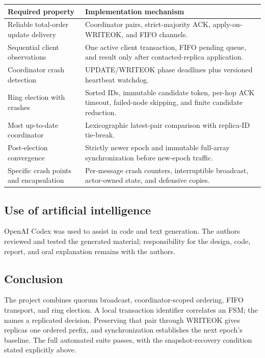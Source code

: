 \noindent\begin{tabularx}{\textwidth}{@{}p{43mm} X@{}}
\toprule
Required property & Implementation mechanism \\
\midrule
Reliable total-order update delivery & Coordinator pairs, strict-majority ACK, apply-on-WRITEOK, and FIFO channels. \\
Sequential client observations & One active client transaction, FIFO pending queue, and result only after contacted-replica application. \\
Coordinator crash detection & UPDATE/WRITEOK phase deadlines plus versioned heartbeat watchdog. \\
Ring election with crashes & Sorted IDs, immutable candidate token, per-hop ACK timeout, failed-node skipping, and finite candidate reduction. \\
Most up-to-date coordinator & Lexicographic latest-pair comparison with replica-ID tie-break. \\
Post-election convergence & Strictly newer epoch and immutable full-array synchronization before new-epoch traffic. \\
Specific crash points and encapsulation & Per-message crash counters, interruptible broadcast, actor-owned state, and defensive copies. \\
\bottomrule
\end{tabularx}

\subsection{Use of artificial intelligence}

OpenAI Codex was used to assist in code and text generation. The authors reviewed and tested the generated material; responsibility for the design, code, report, and oral explanation remains with the authors.

\subsection{Conclusion}

The project combines quorum broadcast, coordinator-scoped ordering, FIFO transport, and ring election. A local transaction identifier correlates an FSM; the  names a replicated decision. Preserving that pair through WRITEOK gives replicas one ordered prefix, and synchronization establishes the next epoch's baseline. The full automated suite passes, with the snapshot-recovery condition stated explicitly above.

